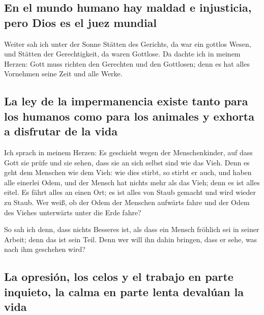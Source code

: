 \hypertarget{en-el-mundo-humano-hay-maldad-e-injusticia-pero-dios-es-el-juez-mundial}{%
\subsection{En el mundo humano hay maldad e injusticia, pero Dios es el
juez
mundial}\label{en-el-mundo-humano-hay-maldad-e-injusticia-pero-dios-es-el-juez-mundial}}

 Weiter sah ich unter der Sonne Stätten des Gerichts, da
war ein gottlos Wesen, und Stätten der Gerechtigkeit, da waren Gottlose.
 Da dachte ich in meinem Herzen: Gott muss richten den
Gerechten und den Gottlosen; denn es hat alles Vornehmen seine Zeit und
alle Werke.

\hypertarget{la-ley-de-la-impermanencia-existe-tanto-para-los-humanos-como-para-los-animales-y-exhorta-a-disfrutar-de-la-vida}{%
\subsection{La ley de la impermanencia existe tanto para los humanos
como para los animales y exhorta a disfrutar de la
vida}\label{la-ley-de-la-impermanencia-existe-tanto-para-los-humanos-como-para-los-animales-y-exhorta-a-disfrutar-de-la-vida}}

 Ich sprach in meinem Herzen: Es geschieht wegen der
Menschenkinder, auf dass Gott sie prüfe und sie sehen, dass sie an sich
selbst sind wie das Vieh.  Denn es geht dem Menschen wie
dem Vieh: wie dies stirbt, so stirbt er auch, und haben alle einerlei
Odem, und der Mensch hat nichts mehr als das Vieh; denn es ist alles
eitel.  Es fährt alles an einen Ort; es ist alles von
Staub gemacht und wird wieder zu Staub.  Wer weiß, ob der
Odem der Menschen aufwärts fahre und der Odem des Viehes unterwärts
unter die Erde fahre?

 So sah ich denn, dass nichts Besseres ist, als dass ein
Mensch fröhlich sei in seiner Arbeit; denn das ist sein Teil. Denn wer
will ihn dahin bringen, dass er sehe, was nach ihm geschehen wird?

\hypertarget{la-opresiuxf3n-los-celos-y-el-trabajo-en-parte-inquieto-la-calma-en-parte-lenta-devaluxfaan-la-vida}{%
\subsection{La opresión, los celos y el trabajo en parte inquieto, la
calma en parte lenta devalúan la
vida}\label{la-opresiuxf3n-los-celos-y-el-trabajo-en-parte-inquieto-la-calma-en-parte-lenta-devaluxfaan-la-vida}}

